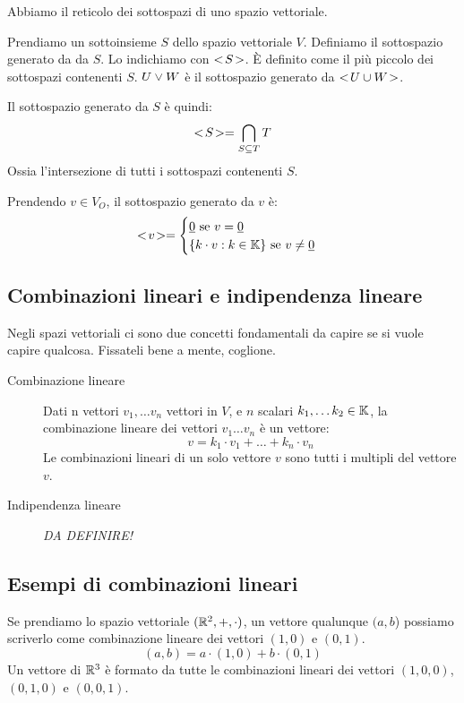Abbiamo il reticolo dei sottospazi di uno spazio vettoriale.

Prendiamo un sottoinsieme $S$ dello spazio vettoriale $V$. Definiamo il sottospazio generato da da $S$. Lo indichiamo con $<\!{S}\!>$. \`E definito come il pi\`u piccolo dei sottospazi contenenti $S$. $U \vee W$ \`e il sottospazio generato da $<\!{U \cup W}\!>$.

Il sottospazio generato da $S$ \`e quindi:
\[
<\!{S}\!> = \bigcap_{S \subseteq T} T
\]
Ossia l'intersezione di tutti i sottospazi contenenti $S$.

Prendendo $v \in V_O$, il sottospazio generato da $v$ \`e:
\[
<\!{v}\!> = 
\begin{cases}
\underline{0} \text{ se } v = \underline{0} \\
\{ k \cdot v : k \in \mathbb{K} \} \text{ se } v \neq \underline{0}
\end{cases}
\]

\subsection{Combinazioni lineari e indipendenza lineare}

Negli spazi vettoriali ci sono due concetti fondamentali da capire se si vuole capire qualcosa. Fissateli bene a mente, coglione.

\begin{description}
    \item[Combinazione lineare] Dati n vettori $v_1, \dots v_n$ vettori in $V$, e $n$ scalari $k_1, \dots k_2 \in \mathbb{K}$, la combinazione lineare dei vettori $v_1 \dots v_n$ \`e un vettore:
    \[
    v = k_1 \cdot v_1 + \dots + k_n \cdot v_n
    \]
    Le combinazioni lineari di un solo vettore $v$ sono tutti i multipli del vettore $v$.
    \item[Indipendenza lineare] \textit{DA DEFINIRE!}
\end{description}

\subsection{Esempi di combinazioni lineari}

Se prendiamo lo spazio vettoriale $(\mathbb{R}^2, +, \cdot)$, un vettore qualunque $(a,b$) possiamo scriverlo come combinazione lineare dei vettori $(1,0)$ e $(0,1)$.
\[
(a,b) = a \cdot (1, 0) + b \cdot (0, 1)
\]
Un vettore di $\mathbb{R}^3$ \`e formato da tutte le combinazioni lineari dei vettori $(1,0,0)$, $(0,1,0)$ e $(0,0,1)$.

